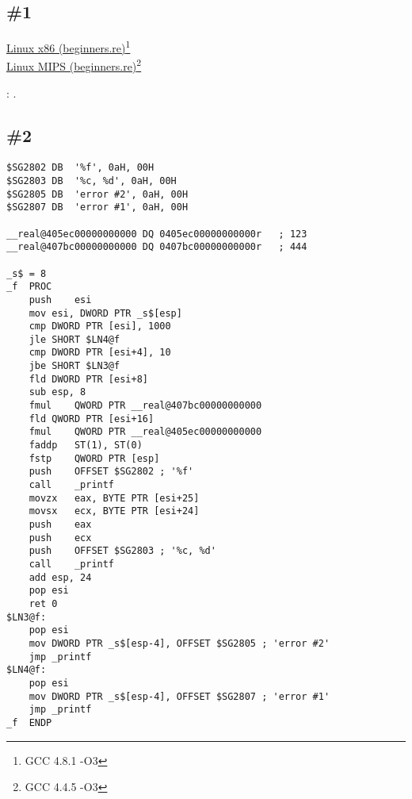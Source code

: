 \section{\Exercises}

\subsection{\Exercise \#1}
\label{exercise_struct_1}

\href{http://go.yurichev.com/17217}{Linux x86 (beginners.re)}\footnote{GCC 4.8.1 -O3}\\
\href{http://go.yurichev.com/17218}{Linux MIPS (beginners.re)}\footnote{GCC 4.4.5 -O3}\\

\Answer{}: .

\subsection{\Exercise \#2}
\label{exercise_struct_2}


\begin{lstlisting}[caption=\Optimizing MSVC 2010]
$SG2802	DB	'%f', 0aH, 00H
$SG2803	DB	'%c, %d', 0aH, 00H
$SG2805	DB	'error #2', 0aH, 00H
$SG2807	DB	'error #1', 0aH, 00H

__real@405ec00000000000 DQ 0405ec00000000000r	; 123
__real@407bc00000000000 DQ 0407bc00000000000r	; 444

_s$ = 8
_f	PROC
	push	esi
	mov	esi, DWORD PTR _s$[esp]
	cmp	DWORD PTR [esi], 1000
	jle	SHORT $LN4@f
	cmp	DWORD PTR [esi+4], 10
	jbe	SHORT $LN3@f
	fld	DWORD PTR [esi+8]
	sub	esp, 8
	fmul	QWORD PTR __real@407bc00000000000
	fld	QWORD PTR [esi+16]
	fmul	QWORD PTR __real@405ec00000000000
	faddp	ST(1), ST(0)
	fstp	QWORD PTR [esp]
	push	OFFSET $SG2802 ; '%f'
	call	_printf
	movzx	eax, BYTE PTR [esi+25]
	movsx	ecx, BYTE PTR [esi+24]
	push	eax
	push	ecx
	push	OFFSET $SG2803 ; '%c, %d'
	call	_printf
	add	esp, 24
	pop	esi
	ret	0
$LN3@f:
	pop	esi
	mov	DWORD PTR _s$[esp-4], OFFSET $SG2805 ; 'error #2'
	jmp	_printf
$LN4@f:
	pop	esi
	mov	DWORD PTR _s$[esp-4], OFFSET $SG2807 ; 'error #1'
	jmp	_printf
_f	ENDP
\end{lstlisting}

